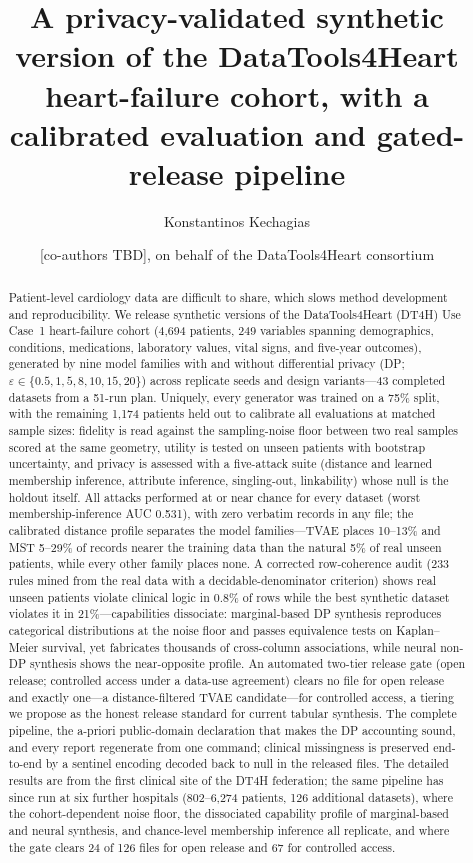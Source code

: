 \documentclass[11pt,a4paper]{article}
\title{A privacy-validated synthetic version of the DataTools4Heart heart-failure
cohort, with a calibrated evaluation and gated-release pipeline}
\author[1]{Konstantinos Kechagias}
\author[ ]{[co-authors TBD], on behalf of the DataTools4Heart consortium}
\affil[1]{Athena Research Center, Greece}
\date{}
\newcommand{\eps}{\ensuremath{\varepsilon}}
\begin{document}
\maketitle

\begin{abstract}
Patient-level cardiology data are difficult to share, which slows method development
and reproducibility. We release synthetic versions of the DataTools4Heart (DT4H) Use
Case~1 heart-failure cohort (4{,}694 patients, 249 variables spanning demographics,
conditions, medications, laboratory values, vital signs, and five-year outcomes),
generated by nine model families with and without differential privacy (DP;
$\eps \in \{0.5, 1, 5, 8, 10, 15, 20\}$) across replicate seeds and design
variants---43 completed datasets from a 51-run plan. Uniquely, every generator was
trained on a 75\% split, with the remaining 1{,}174 patients held out to calibrate
all evaluations at matched sample sizes: fidelity is read against the sampling-noise
floor between two real samples scored at the same geometry, utility is tested on
unseen patients with bootstrap uncertainty, and privacy is assessed with a
five-attack suite (distance and learned membership inference, attribute inference,
singling-out, linkability) whose null is the holdout itself. All attacks performed
at or near chance for every dataset (worst membership-inference AUC 0.531), with
zero verbatim records in any file; the calibrated distance profile separates the
model families---TVAE places 10--13\% and MST 5--29\% of records nearer the
training data than the natural 5\% of real unseen patients, while every other
family places none. A corrected row-coherence audit (233 rules mined from the real
data with a decidable-denominator criterion) shows real unseen patients violate
clinical logic in 0.8\% of rows while the best synthetic dataset violates it in
21\%---capabilities dissociate: marginal-based DP synthesis reproduces categorical
distributions at the noise floor and passes equivalence tests on Kaplan--Meier
survival, yet fabricates thousands of cross-column associations, while neural
non-DP synthesis shows the near-opposite profile. An automated two-tier release
gate (open release; controlled access under a data-use agreement) clears no file
for open release and exactly one---a distance-filtered TVAE candidate---for
controlled access, a tiering we propose as the honest release standard for current
tabular synthesis. The complete pipeline, the a-priori public-domain declaration
that makes the DP accounting sound, and every report regenerate from one command;
clinical missingness is preserved end-to-end by a sentinel encoding decoded back to
null in the released files. The detailed results are from the first clinical site
of the DT4H federation; the same pipeline has since run at six further hospitals
(802--6{,}274 patients, 126 additional datasets), where the cohort-dependent noise
floor, the dissociated capability profile of marginal-based and neural synthesis,
and chance-level membership inference all replicate, and where the gate clears
24 of 126 files for open release and 67 for controlled access.
\end{abstract}
\end{document}
